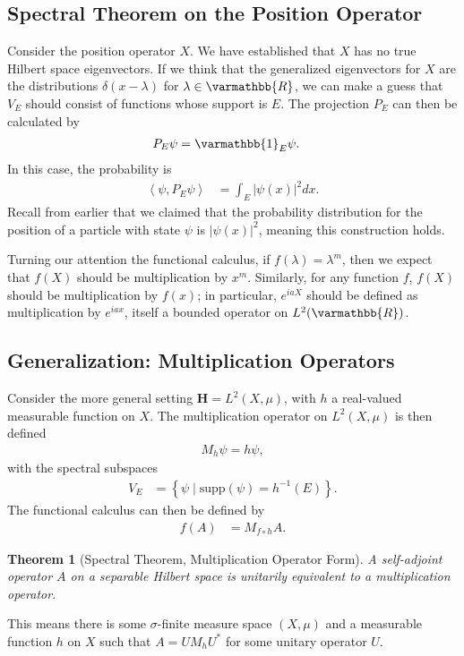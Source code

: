 \documentclass[12pt]{extarticle}
\newcommand{\R}{\varmathbb{R}}
\newcommand{\set}[1]{\left\{#1\right\}}
\newcommand{\iprod}[2]{\left\langle #1,#2\right\rangle}
\theoremstyle{plain}
\newtheorem*{theorem}{Theorem}%
\theoremstyle{definition}
\theoremstyle{remark}
\renewcommand{\newline}{\hfill\break}
\begin{document}
  \subsection{Spectral Theorem on the Position Operator}%
  Consider the position operator $X$. We have established that $X$ has no true Hilbert space eigenvectors. If we think that the generalized eigenvectors for $X$ are the distributions $\delta(x-\lambda)$ for $\lambda \in \R$, we can make a guess that $V_E$ should consist of functions whose support is $E$. The projection $P_E$ can then be calculated by
  \begin{align*}
    P_E\psi &= \varmathbb{1}_{E}\psi.
  \end{align*}
  In this case, the probability is
  \begin{align*}
    \iprod{\psi}{P_E\psi} &= \int_{E}|\psi(x)|^2dx.
  \end{align*}
  Recall from earlier that we claimed that the probability distribution for the position of a particle with state $\psi$ is $|\psi(x)|^2$, meaning this construction holds.\newline

  Turning our attention the functional calculus, if $f(\lambda) = \lambda^m$, then we expect that $f(X)$ should be multiplication by $x^m$. Similarly, for any function $f$, $f(X)$ should be multiplication by $f(x)$; in particular, $e^{iaX}$ should be defined as multiplication by $e^{iax}$, itself a bounded operator on $L^2(\R)$.
  \subsection{Generalization: Multiplication Operators}%
  Consider the more general setting $\mathbf{H} = L^{2}(X,\mu)$, with $h$ a real-valued measurable function on $X$. The multiplication operator on $L^{2}(X,\mu)$ is then defined
  \begin{align*}
    M_h\psi = h\psi,
  \end{align*}
  with the spectral subspaces
  \begin{align*}
    V_E &= \set{\psi\mid \text{supp}(\psi) = h^{-1}(E)}.
  \end{align*}
  The functional calculus can then be defined by
  \begin{align*}
    f(A) &= M_{f\circ h}A.
  \end{align*}
  \begin{theorem}[Spectral Theorem, Multiplication Operator Form]
    A self-adjoint operator $A$ on a separable Hilbert space is unitarily equivalent to a multiplication operator.
  \end{theorem}
  This means there is some $\sigma$-finite measure space $(X,\mu)$ and a measurable function $h$ on $X$ such that $A = UM_hU^{\ast}$ for some unitary operator $U$.
\end{document}
